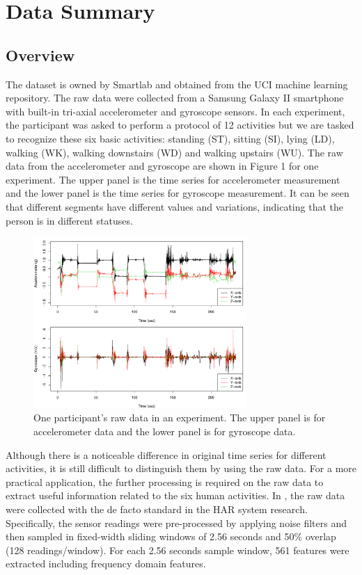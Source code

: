 \documentclass[conference]{IEEEtran}
\begin{document}
\section{Data Summary}
\subsection{Overview}
The dataset is owned by Smartlab and obtained from the UCI machine learning repository. The raw data were collected from a Samsung Galaxy II smartphone with built-in tri-axial accelerometer and gyroscope sensors. In each experiment, the participant was asked to perform a protocol of 12 activities but we are tasked to recognize these six basic activities: standing (ST), sitting (SI), lying (LD), walking (WK), walking downstairs (WD) and walking upstairs (WU). The raw data from the accelerometer and gyroscope are shown in Figure 1 for one experiment. The upper panel is the time series for accelerometer measurement and the lower panel is the time series for gyroscope measurement. It can be seen that different segments have different values and variations, indicating that the person is in different statuses.

\begin{figure}[!ht]
\centering
\includegraphics[width=3.2in]{figure1.pdf}
\caption{One participant's raw data in an experiment. The upper panel is for accelerometer data and the lower panel is for gyroscope data.
}
\label{fig_sim}
\end{figure}

Although there is a noticeable difference in original time series for different activities, it is still difficult to distinguish them by using the raw data. For a more practical application, the further processing is required on the raw data to extract useful information related to the six human activities. In \cite{ortiz2015smartphone}, the raw data were collected with the de facto standard in the HAR system research. Specifically, the sensor readings were pre-processed by applying noise filters and then sampled in fixed-width sliding windows of 2.56 seconds and 50$\%$  overlap (128 readings/window). For each 2.56 seconds sample window, 561 features were extracted including frequency domain features.
\end{document}
